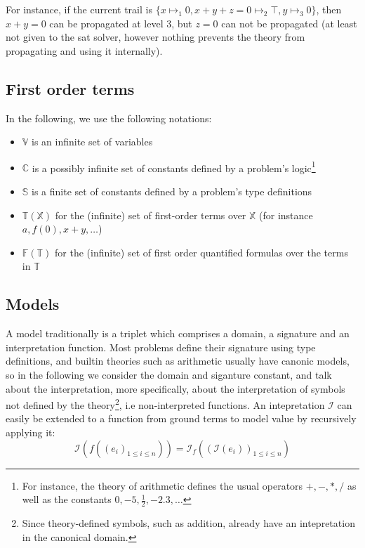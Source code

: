 \documentclass{article}
\begin{document}
For instance, if the current trail is $\{x \mapsto_1 0, x + y + z = 0 \mapsto_2 \top, y\mapsto_3 0\}$,
then $x + y = 0$ can be propagated at level $3$, but $z = 0$ can not be propagated (at least not
given to the sat solver, however nothing prevents the theory from propagating and using it internally).
\subsection{First order terms}

In the following, we use the following notations:
\begin{itemize}
  \item $\mathbb{V}$ is an infinite set of variables
  \item $\mathbb{C}$ is a possibly infinite set of constants defined
    by a problem's logic\footnote{For instance, the theory of arithmetic
    defines the usual operators $+, -, *, /$ as well as the constants
    $0, -5, \frac{1}{2}, -2.3, \ldots$}
  \item $\mathbb{S}$ is a finite set of constants defined by a problem's type definitions
  \item $\mathbb{T}(\mathbb{X})$ for the (infinite) set of first-order terms over $\mathbb{X}$
    (for instance $a, f(0), x + y, \ldots$)
  \item $\mathbb{F}(\mathbb{T})$ for the (infinite) set of first order quantified formulas
    over the terms in $\mathbb{T}$
\end{itemize}

\subsection{Models}

A model traditionally is a triplet which comprises a domain, a signature and an interpretation function.
Most problems define their signature using type definitions, and builtin theories such as arithmetic
usually have canonic models, so in the following we consider the domain and siganture constant, and
talk about the interpretation, more specifically, about the interpretation of symbols not defined
by the theory\footnote{Since theory-defined symbols, such as addition, already have an intepretation
in the canonical domain.}, i.e non-interpreted functions. An intepretation $\mathcal{I}$ can easily
be extended to a function from ground terms to model value by recursively applying it:
\[
  \mathcal{I}( f ( {(e_i)}_{1\leq i \leq n})) = \mathcal{I}_f ( {( \mathcal{I}(e_i) )}_{1 \leq i \leq n} )
\]
\end{document}
